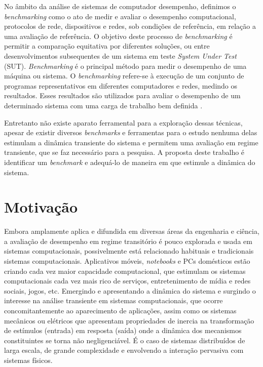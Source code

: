No âmbito da análise de sistemas de computador desempenho, definimos o \textit{benchmarking} como o ato de medir e avaliar o desempenho computacional, protocolos de rede, dispositivos e redes, sob condições de referência, em relação a uma avaliação de referência. O objetivo deste processo de \textit{benchmarking} é permitir a comparação equitativa por diferentes soluções, ou entre desenvolvimentos subsequentes de um sistema em teste \textit{System Under Test} (SUT). \textit{Benchmarking} é o principal método para medir o desempenho de uma máquina ou sistema. O \textit{benchmarking} refere-se à execução de um conjunto de programas representativos em diferentes computadores e redes, medindo os resultados. Esses resultados são utilizados para avaliar o desempenho de um determinado sistema com uma carga de trabalho bem definida \cite{Menasce2001}.


Entretanto não existe aparato ferramental para a exploração dessas técnicas, apesar de existir diversos \textit{benchmarks} e ferramentas para o estudo nenhuma delas estimulam a dinâmica transiente do sistema e permitem uma avaliação em regime transiente, que se faz necessário para a pesquisa. A proposta deste trabalho é identificar um \textit{benchmark} e adequá-lo de maneira em que estimule a dinâmica do sistema.


\section{Motivação}
Embora amplamente aplica e difundida em diversas áreas da engenharia e ciência, a avaliação de desempenho em regime transitório é pouco explorada e usada em sistemas computacionais, possivelmente está relacionado habituais e tradicionais sistemas computacionais. Aplicativos móveis, \textit{notebooks} e PCs domésticos estão criando cada vez maior capacidade computacional, que estimulam os sistemas computacionais cada vez mais rico de serviços, entretenimento de mídia e redes sociais, jogos, etc. Emergindo e apresentando a dinâmica do sistema e surgindo o interesse na análise transiente em sistemas computacionais, que ocorre concomitantemente ao aparecimento de aplicações, assim como os sistemas mecânicos ou elétricos que apresentam propriedades de inercia na transformação de estímulos (entrada) em resposta (saída) onde a dinâmica dos mecanismos constituintes se torna não negligenciável. É o caso de sistemas distribuídos de larga escala, de grande complexidade e envolvendo a interação pervasiva com sistemas físicos. \cite{Egami2011, Kannan2011} 

